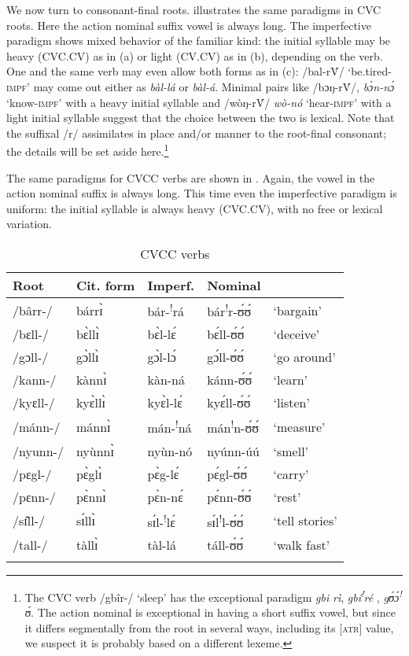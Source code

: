 \documentclass[output=paper,newtxmath,modfonts,nonflat,draftmode]{langsci/langscibook}
\begin{document}
\newpage 
We now turn to consonant-final roots.  illustrates the same paradigms in CVC roots. Here the action nominal suffix vowel is always long. The imperfective paradigm shows mixed behavior of the familiar kind: the initial syllable may be heavy (CVC.CV) as in (a) or light (CV.CV) as in (b), depending on the verb. One and the same verb may even allow both forms as in (c): /bal-r\'{V}/ ‘be.tired-\textsc{impf’} may come out either as \textit{bàl-lá} or \textit{bàl-á}. Minimal pairs like /bɔŋ{}-r\'{V}/, \textit{bɔ̀n-nɔ́} ‘know-\textsc{impf}’ with a heavy initial syllable and /wòŋ{}-r\'{V}/ \textit{wò-nó} ‘hear-\textsc{impf}’ with a light initial syllable suggest that the choice between the two is lexical. Note that the suffixal /r/ assimilates in place and/or manner to the root-final consonant; the details will be set aside here.\footnote{The CVC verb /gb\^{i}r-/ ‘sleep’ has the exceptional paradigm \textit{gbi }\textit{rì}, \textit{gbí}\textit{\textsuperscript{!}}\textit{ré{} }, \textit{gʊ́ɔ́}\textit{\textsuperscript{!}}\textit{ʊ́}. The action nominal is exceptional in having a short suffix vowel, but since it differs segmentally from the root in several ways, including its [\textsc{atr}] value, we suspect it is probably based on a different lexeme.}
     
     The same paradigms for CVCC verbs are shown in . Again, the vowel in the action nominal suffix is always long.  This time even the imperfective paradigm is uniform: the initial syllable is always heavy (CVC.CV), with no free or lexical variation.

\begin{table}
\begin{tabularx}{\textwidth}{llXXX} 
\lsptoprule
{Root} & {Cit. form} & {Imperf.} & {Nominal} & \\
\midrule
/bârr-/&	bárrɪ̀&	bár-\textsuperscript{!}rá&	bár\textsuperscript{!}r-ʊ́ʊ́&	‘bargain’\\
/bɛll-/&	bɛ̀llɪ̀&	bɛ̀l-lɛ́&	bɛ́ll-ʊ́ʊ́&	‘deceive’\\
/gɔll-/&	gɔ̀llɪ̀&	gɔ̀l-lɔ́&	gɔ́ll-ʊ́ʊ́&	‘go around’\\
/kann-/&	kànnɪ̀&	kàn-ná&	kánn-ʊ́ʊ́&	‘learn’\\
/kyɛll-/&	kyɛ̀llɪ̀&	kyɛ̀l-lɛ́&	kyɛ́ll-ʊ́ʊ́&	‘listen’\\
/mánn-/&	mánnɪ̀&	mán-\textsuperscript{!}ná&	mán\textsuperscript{!}n-ʊ́ʊ́&	‘measure’\\
/nyunn-/&	nyùnnɪ̀&	nyùn-nó&	nyúnn-úú&	‘smell’\\
/pɛgl-/&	pɛ̀glɪ̀&	pɛ̀g-lɛ́&	pɛ́gl-ʊ́ʊ́&	‘carry’\\
/pɛnn-/&	pɛ̀nnɪ̀&	pɛ̀n-nɛ́&	pɛ́nn-ʊ́ʊ́&	‘rest’\\
/sɪ̂ll-/&	sɪ́llɪ̀&	sɪ́l-\textsuperscript{!}lɛ́&	sɪ́l\textsuperscript{!}l-ʊ́ʊ́&	‘tell stories’\\
/tall-/&	tàllɪ̀&	tàl-lá&	táll-ʊ́ʊ́&	‘walk fast’\\
\lspbottomrule
\end{tabularx}
\caption{CVCC verbs}
\label{tab:anttila:10}
\end{table}
\end{document}
